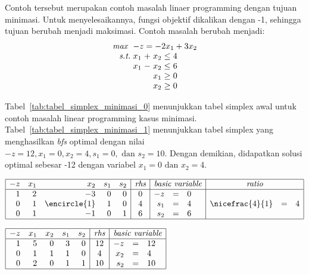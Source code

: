 Contoh tersebut merupakan contoh masalah linaer programming dengan tujuan minimasi. Untuk menyelesaikannya, fungsi objektif dikalikan dengan -1, sehingga tujuan berubah menjadi maksimasi. Contoh masalah berubah menjadi:
\begin{equation*}
	\setlength\arraycolsep{1.5pt}
	\begin{array}{r r c r c l}
		\textit{max } &\multicolumn{5}{l}{-z = -2x_1 + 3x_2}\\
		\textit{s.t.} &x_1 &+ &x_2 &\leq &4\\
		&x_1 &- &x_2 &\leq &6\\
		&&&x_1 &\geq &0\\
		&&&x_2 &\geq &0\\
	\end{array}
\end{equation*}

Tabel~\ref{tab:tabel_simplex_minimasi_0} menunjukkan tabel simplex awal untuk contoh masalah linear programming kasus minimasi. Tabel~\ref{tab:tabel_simplex_minimasi_1} menunjukkan tabel simplex yang menghasilkan \textit{bfs} optimal dengan nilai \(-z=12, x_1=0, x_2=4, s_1=0, \text{ dan } s_2=10\). Dengan demikian, didapatkan solusi optimal sebesar -12 dengan variabel \(x_1=0 \text{ dan } x_2=4\).

\begin{center}
	\label{tab:tabel_simplex_minimasi_0}
	$
	\begin{array}{|r r r r r |c|r c l|r c l|}
		\hline
		-z & x_1 & x_2 & s_1 & s_2 & \textit{rhs} & \multicolumn{3}{c|}{\textit{basic variable}} & \multicolumn{3}{c|}{\textit{ratio}}\\
		\hline
		1 & 2 & -3 & 0 & 0 & 0 & -z & = & 0 &&&\\
		0 & 1 & \encircle{1} & 1 & 0 & 4 & s_1 & = & 4 & \nicefrac{4}{1} & = & 4\\
		0 & 1 & -1 & 0 & 1 & 6 & s_2 & = & 6 &&&\\
		\hline
	\end{array}
	$
\end{center}

\begin{center}
	\label{tab:tabel_simplex_minimasi_1}
	$
	\begin{array}{|r r r r r |c|r c l|}
		\hline
		-z & x_1 & x_2 & s_1 & s_2 & \textit{rhs} & \multicolumn{3}{c|}{\textit{basic variable}}\\
		\hline
		1 & 5 & 0 & 3 & 0 & 12 & -z & = & 12\\
		0 & 1 & 1 & 1 & 0 & 4 & x_2 & = & 4\\
		0 & 2 & 0 & 1 & 1 & 10 & s_2 & = & 10\\
		\hline
	\end{array}
	$
\end{center}

